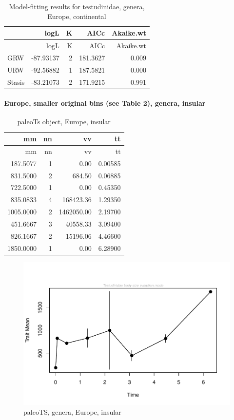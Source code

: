 \documentclass[]{article}
\let\oldparagraph\paragraph
\renewcommand{\paragraph}[1]{\oldparagraph{#1}\mbox{}}
\begin{document}
\begin{longtable}[]{@{}lrrrr@{}}
\caption{Model-fitting results for testudinidae, genera, Europe,
continental}\tabularnewline
\toprule
& logL & K & AICc & Akaike.wt\tabularnewline
\midrule
\endfirsthead
\toprule
& logL & K & AICc & Akaike.wt\tabularnewline
\midrule
\endhead
GRW & -87.93137 & 2 & 181.3627 & 0.009\tabularnewline
URW & -92.56882 & 1 & 187.5821 & 0.000\tabularnewline
Stasis & -83.21073 & 2 & 171.9215 & 0.991\tabularnewline
\bottomrule
\end{longtable}

\newpage

\paragraph{Europe, smaller original bins (see Table 2), genera,
insular}\label{europe-smaller-original-bins-see-table-2-genera-insular}

\begin{longtable}[]{@{}rrrr@{}}
\caption{paleoTs object, Europe, insular}\tabularnewline
\toprule
mm & nn & vv & tt\tabularnewline
\midrule
\endfirsthead
\toprule
mm & nn & vv & tt\tabularnewline
\midrule
\endhead
187.5077 & 1 & 0.00 & 0.00585\tabularnewline
831.5000 & 2 & 684.50 & 0.06885\tabularnewline
722.5000 & 1 & 0.00 & 0.45350\tabularnewline
835.0833 & 4 & 168423.36 & 1.29350\tabularnewline
1005.0000 & 2 & 1462050.00 & 2.19700\tabularnewline
451.6667 & 3 & 40558.33 & 3.09400\tabularnewline
826.1667 & 2 & 15196.06 & 4.46600\tabularnewline
1850.0000 & 1 & 0.00 & 6.28900\tabularnewline
\bottomrule
\end{longtable}

\begin{figure}[htbp]
\centering
\includegraphics{MA_JJ_files/figure-latex/pTSEuI-1.pdf}
\caption{paleoTS, genera, Europe, insular}
\end{figure}
\end{document}
